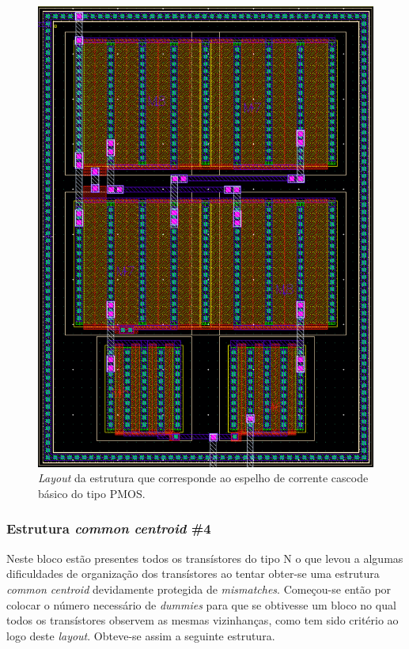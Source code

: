 \documentclass[11pt]{article}
\numberwithin{equation}{section}
\begin{document}
\pagebreak

\begin{figure}[H]
	\centering
	\includegraphics[keepaspectratio=true, scale=0.57]{exps/layout/espelhodecorrenteamp}
	\vspace{-0.5em}
	\caption{\textit{Layout} da estrutura que corresponde ao espelho de corrente cascode básico do tipo PMOS.}
	\vspace{-0.8em}
\end{figure}

\pagebreak

\subsubsection{Estrutura \textit{common centroid} \#4}

Neste bloco estão presentes todos os transístores do tipo N o que levou a algumas dificuldades de organização dos transístores ao tentar obter-se uma estrutura \textit{common centroid} devidamente protegida de \textit{mismatches}. Começou-se então por colocar o número necessário de \textit{dummies} para que se obtivesse um bloco no qual todos os transístores observem as mesmas vizinhanças, como tem sido critério ao logo deste \textit{layout}. Obteve-se assim a seguinte estrutura.
\end{document}
